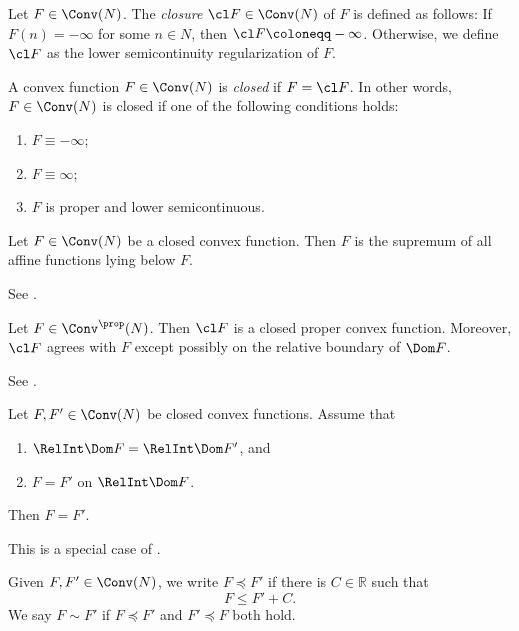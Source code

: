 \begin{definition}\label{def:convexclosure}
    Let $F\in \Conv(N)$. The \emph{closure} $\cl F\in \Conv(N)$ of $F$ is defined as follows: If $F(n)=-\infty$ for some $n\in N$, then $\cl F\coloneqq -\infty$. Otherwise, we define $\cl F$ as the lower semicontinuity regularization of $F$.

    A convex function $F\in \Conv(N)$ is \emph{closed} if $F=\cl F$. In other words, $F\in \Conv(N)$ is closed if one of the following conditions holds:
    \begin{enumerate}
        \item\label{itm:def:convexclosure:1} $F\equiv -\infty$;
        \item\label{itm:def:convexclosure:2} $F\equiv \infty$;
        \item\label{itm:def:convexclosure:3} $F$ is proper and lower semicontinuous.
    \end{enumerate}
\end{definition}
\begin{proposition}
    Let $F\in \Conv(N)$ be a closed convex function. Then $F$ is the supremum of all affine functions lying below $F$.
\end{proposition}
See \cite[Theorem~12.1]{Roc70}.

\begin{theorem}\label{thm:closurepropconv}
    Let $F\in \Conv^{\prop}(N)$. Then $\cl F$ is a closed proper convex function. Moreover, $\cl F$ agrees with $F$ except possibly on the relative boundary of $\Dom F$.
\end{theorem}
See \cite[Theorem~7.4]{Roc70}.

\begin{proposition}\label{prop:closedcvx_domain}
    Let $F,F'\in \Conv(N)$ be closed convex functions. Assume that
    \begin{enumerate}
        \item\label{itm:prop:closedcvx_domain:1} $\RelInt \Dom F=\RelInt \Dom F'$, and
        \item\label{itm:prop:closedcvx_domain:2} $F=F'$ on $\RelInt \Dom F$.
    \end{enumerate}
    Then $F=F'$.
\end{proposition}
This is a special case of \cite[Corollary~7.3.4]{Roc70}.

\begin{definition}\label{def:partialorderconv}
    Given $F,F'\in \Conv(N)$, we write $F\preceq F'$ if there is $C\in \mathbb{R}$ such that
    \[
        F\leq F'+C.
    \]
    We say $F\sim F'$ if $F\preceq F'$ and $F'\preceq F$ both hold.
\end{definition}


